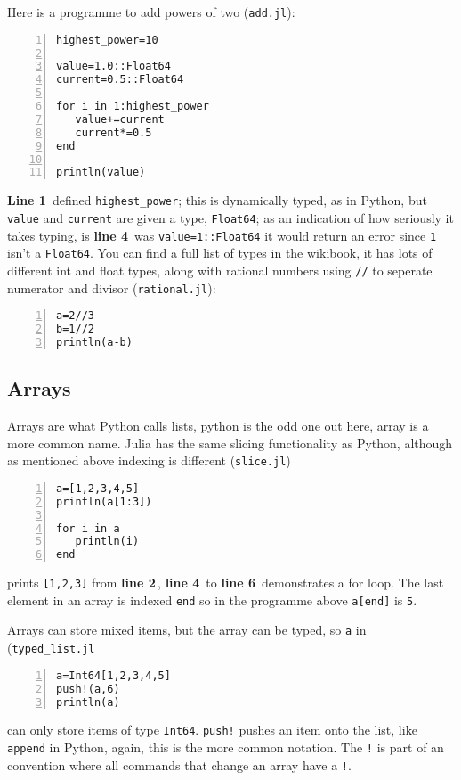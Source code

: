 \documentclass[11pt,a4paper]{scrartcl}
\newcommand{\lnn}[1]{\textbf{line #1}\,}
\newcommand{\Lnn}[1]{\textbf{Line #1}\,}
\begin{document}
Here is a programme to add powers of two (\texttt{add.jl}):
\begin{lstlisting}[numbers=left]
highest_power=10

value=1.0::Float64
current=0.5::Float64

for i in 1:highest_power
   value+=current
   current*=0.5
end

println(value)
\end{lstlisting}
\Lnn{1} defined \texttt{highest\_power}; this is dynamically typed, as
in Python, but \texttt{value} and \texttt{current} are given a type,
\texttt{Float64}; as an indication of how seriously it takes typing,
is \lnn{4} was \texttt{value=1::Float64} it would return an error
since \texttt{1} isn't a \texttt{Float64}. You can find a full list of
types in the wikibook, it has lots of different int and float types,
along with rational numbers using \texttt{//} to seperate numerator and divisor (\texttt{rational.jl}):
\begin{lstlisting}[numbers=left]
a=2//3
b=1//2
println(a-b)
\end{lstlisting}

\subsection*{Arrays}
Arrays are what Python calls lists, python is the odd one out here,
array is a more common name. Julia has the same slicing functionality
as Python, although as mentioned above indexing is different (\texttt{slice.jl})
\begin{lstlisting}[numbers=left]
a=[1,2,3,4,5]
println(a[1:3])

for i in a
   println(i)
end

\end{lstlisting}
prints \texttt{[1,2,3]} from \lnn{2}, \lnn{4} to \lnn{6} demonstrates
a for loop. The last element in an array is indexed \texttt{end} so in
the programme above \texttt{a[end]} is \texttt{5}.

Arrays can store mixed items, but the array can be typed, so \texttt{a} in (\texttt{typed\_list.jl}
\begin{lstlisting}[numbers=left]
a=Int64[1,2,3,4,5]
push!(a,6)
println(a)
\end{lstlisting}
can only store items of type \texttt{Int64}. \texttt{push!} pushes an
item onto the list, like \texttt{append} in Python, again, this is the
more common notation. The \texttt{!} is part of an convention where
all commands that change an array have a \texttt{!}.
\end{document}
